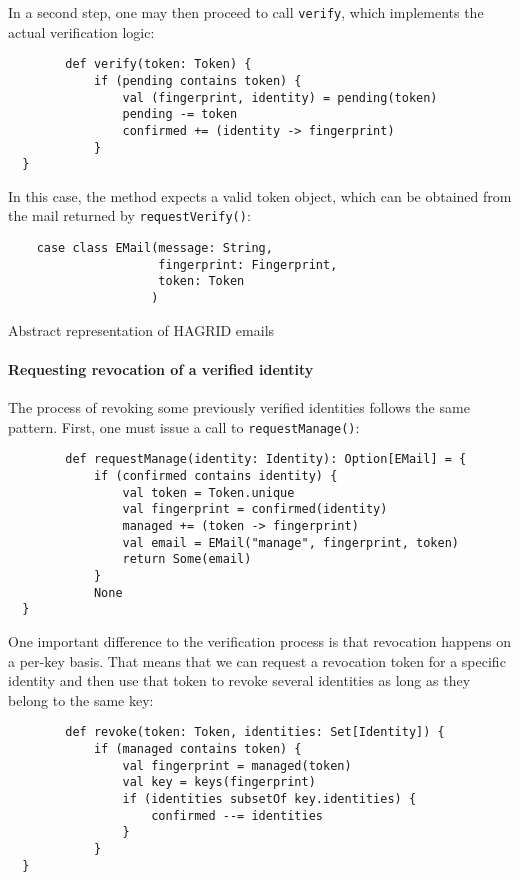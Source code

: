 In a second step, one may then proceed to call \texttt{verify}, which implements the actual verification logic: 
\begin{code}
    \begin{verbatim}
        def verify(token: Token) {
            if (pending contains token) {
                val (fingerprint, identity) = pending(token)
                pending -= token
                confirmed += (identity -> fingerprint)
            }
  }
    \end{verbatim}
    
\end{code}
In this case, the method expects a valid token object, which can be obtained from the mail returned by \texttt{requestVerify()}: 
\begin{code}
    \begin{verbatim}
    case class EMail(message: String, 
                     fingerprint: Fingerprint, 
                     token: Token
                    )
    \end{verbatim}
    \caption{Abstract representation of HAGRID emails}
\end{code}

\paragraph{Requesting revocation of a verified identity} The process of revoking some previously verified identities follows the same pattern. First, one must issue a call to \texttt{requestManage()}: 
\begin{code}
    \begin{verbatim}
        def requestManage(identity: Identity): Option[EMail] = {
            if (confirmed contains identity) {
                val token = Token.unique
                val fingerprint = confirmed(identity)
                managed += (token -> fingerprint)
                val email = EMail("manage", fingerprint, token)
                return Some(email)
            }
            None
  }
    \end{verbatim}
\end{code}
One important difference to the verification process is that revocation happens on a per-key basis. That means that we can request a revocation token for a specific identity and then use that token to revoke several identities as long as they belong to the same key: 
\begin{code}
    \begin{verbatim}
        def revoke(token: Token, identities: Set[Identity]) {
            if (managed contains token) {
                val fingerprint = managed(token)
                val key = keys(fingerprint)
                if (identities subsetOf key.identities) {
                    confirmed --= identities
                }
            }
  }
    \end{verbatim}
\end{code}

